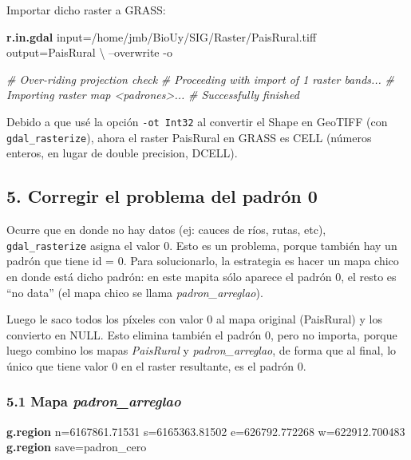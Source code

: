 \documentclass[spanish,]{article}
\newenvironment{Shaded}{}{}
\newcommand{\KeywordTok}[1]{\textcolor[rgb]{0.00,0.44,0.13}{\textbf{{#1}}}}
\newcommand{\CommentTok}[1]{\textcolor[rgb]{0.38,0.63,0.69}{\textit{{#1}}}}
\newcommand{\NormalTok}[1]{{#1}}
\begin{document}
Importar dicho raster a GRASS:

\begin{Shaded}
\begin{Highlighting}[]
\KeywordTok{r.in.gdal} \NormalTok{input=/home/jmb/BioUy/SIG/Raster/PaisRural.tiff output=PaisRural \textbackslash{}}
  \NormalTok{--overwrite -o}

\CommentTok{# Over-riding projection check}
\CommentTok{# Proceeding with import of 1 raster bands...}
\CommentTok{# Importing raster map <padrones>...}
\CommentTok{# Successfully finished}
\end{Highlighting}
\end{Shaded}

Debido a que usé la opción \texttt{-ot\ Int32} al convertir el Shape en
GeoTIFF (con \texttt{gdal\_rasterize}), ahora el raster PaisRural en
GRASS es CELL (números enteros, en lugar de double precision, DCELL).

\subsection{5. Corregir el problema del padrón
0}\label{corregir-el-problema-del-padruxf3n-0}

Ocurre que en donde no hay datos (ej: cauces de ríos, rutas, etc),
\texttt{gdal\_rasterize} asigna el valor 0. Esto es un problema, porque
también hay un padrón que tiene id = 0. Para solucionarlo, la estrategia
es hacer un mapa chico en donde está dicho padrón: en este mapita sólo
aparece el padrón 0, el resto es ``no data'' (el mapa chico se llama
\emph{padron\_arreglao}).

Luego le saco todos los píxeles con valor 0 al mapa original (PaisRural)
y los convierto en NULL. Esto elimina también el padrón 0, pero no
importa, porque luego combino los mapas \emph{PaisRural} y
\emph{padron\_arreglao}, de forma que al final, lo único que tiene valor
0 en el raster resultante, es el padrón 0.

\subsubsection{\texorpdfstring{5.1 Mapa
\emph{padron\_arreglao}}{5.1 Mapa padron\_arreglao}}\label{mapa-padronux5farreglao}

\begin{Shaded}
\begin{Highlighting}[]
\KeywordTok{g.region} \NormalTok{n=6167861.71531 s=6165363.81502 e=626792.772268 w=622912.700483}
\KeywordTok{g.region} \NormalTok{save=padron_cero}
\end{Highlighting}
\end{Shaded}
\end{document}
